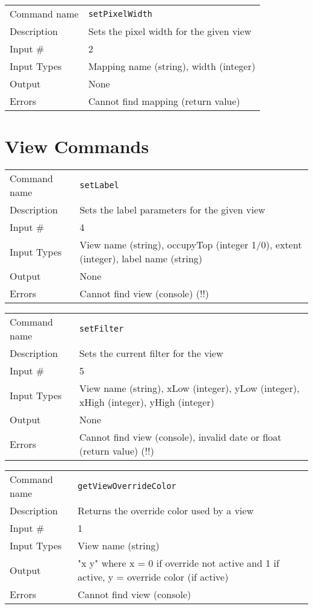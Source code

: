 \bigskip

\noindent
\begin{tabular}{l|p{5in}}
\hline
Command name & {\tt setPixelWidth} \\
Description  & Sets the pixel width for the given view \\
Input \#     & 2 \\
Input Types  & Mapping name (string), width (integer) \\
Output       & None \\
Errors       & Cannot find mapping (return value) \\
\hline
\end{tabular}

\section{View Commands}

\noindent
\begin{tabular}{l|p{5in}}
\hline
Command name & {\tt setLabel} \\
Description  & Sets the label parameters for the given view \\
Input \#     & 4 \\
Input Types  & View name (string), occupyTop (integer 1/0),
               extent (integer), label name (string) \\
Output       & None \\
Errors       & Cannot find view (console) (!!) \\
\hline
\end{tabular}

\bigskip

\noindent
\begin{tabular}{l|p{5in}}
\hline
Command name & {\tt setFilter} \\
Description  & Sets the current filter for the view \\
Input \#     & 5 \\
Input Types  & View name (string), xLow (integer), yLow (integer),
               xHigh (integer), yHigh (integer) \\
Output       & None \\
Errors       & Cannot find view (console), invalid date or float
               (return value) (!!) \\
\hline
\end{tabular}

\bigskip

\noindent
\begin{tabular}{l|p{5in}}
\hline
Command name & {\tt getViewOverrideColor} \\
Description  & Returns the override color used by a view \\
Input \#     & 1 \\
Input Types  & View name (string) \\
Output       & "x y" where x = 0 if override not active and 1 if active,
               y = override color (if active) \\
Errors       & Cannot find view (console) \\
\hline
\end{tabular}

